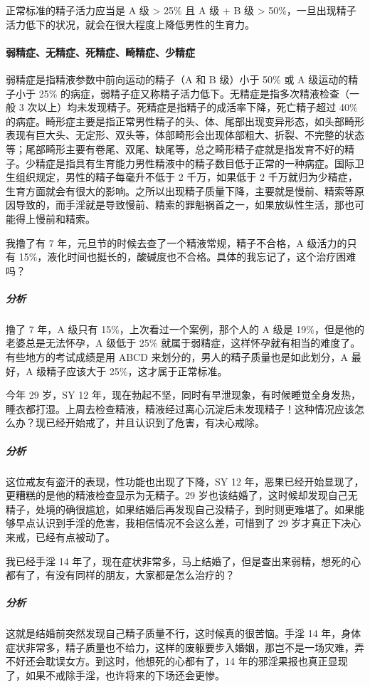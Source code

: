 正常标准的精子活力应当是 A 级 > 25\% 且 A 级 + B 级 > 50\%，一旦出现精子活力低下的状况，就会在很大程度上降低男性的生育力。

\paragraph{弱精症、无精症、死精症、畸精症、少精症}

弱精症是指精液参数中前向运动的精子（A 和 B 级）小于 50\% 或 A 级运动的精子小于 25\% 的病症，弱精子症又称精子活力低下。无精症是指多次精液检查（一般 3 次以上）均未发现精子。死精症是指精子的成活率下降，死亡精子超过 40\% 的病症。畸形症主要是指正常男性精子的头、体、尾部出现变异形态，如头部畸形表现有巨大头、无定形、双头等，体部畸形会出现体部粗大、折裂、不完整的状态等；尾部畸形主要有卷尾、双尾、缺尾等，总之畸形精子症就是指发育不好的精子。少精症是指具有生育能力男性精液中的精子数目低于正常的一种病症。国际卫生组织规定，男性的精子每毫升不低于 2 千万，如果低于 2 千万就归为少精症，生育方面就会有很大的影响。之所以出现精子质量下降，主要就是慢前、精索等原因导致的，而手淫就是导致慢前、精索的罪魁祸首之一，如果放纵性生活，那也可能得上慢前和精索。

\begin{case}[不孕不育]
    我撸了有 7 年，元旦节的时候去查了一个精液常规，精子不合格，A 级活力的只有 15\%，液化时间也挺长的，酸碱度也不合格。具体的我忘记了，这个治疗困难吗？
    \subparagraph{分析} 撸了 7 年，A 级只有 15\%，上次看过一个案例，那个人的 A 级是 19\%，但是他的老婆总是无法怀孕，A 级低于 25\% 就属于弱精症，这样怀孕就有相当的难度了。有些地方的考试成绩是用 ABCD 来划分的，男人的精子质量也是如此划分，A 最好，A 级精子应该大于 25\%，这才属于正常标准。
\end{case}

\begin{case}[不孕不育]
    今年 29 岁，SY 12 年，现在勃起不坚，同时有早泄现象，有时候睡觉全身发热，睡衣都打湿。上周去检查精液，精液经过离心沉淀后未发现精子！这种情况应该怎么办？现已经开始戒了，并且认识到了危害，有决心戒除。
    \subparagraph{分析} 这位戒友有盗汗的表现，性功能也出现了下降，SY 12 年，恶果已经开始显现了，更糟糕的是他的精液检查显示为无精子。29 岁也该结婚了，这时候却发现自己无精子，处境的确很尴尬，如果结婚后再发现自己没精子，到时则更难堪了。如果能够早点认识到手淫的危害，我相信情况不会这么差，可惜到了 29 岁才真正下决心来戒，已经有点被动了。
\end{case}

\begin{case}[不孕不育]
    我已经手淫 14 年了，现在症状非常多，马上结婚了，但是查出来弱精，想死的心都有了，有没有同样的朋友，大家都是怎么治疗的？
    \subparagraph{分析} 这就是结婚前突然发现自己精子质量不行，这时候真的很苦恼。手淫 14 年，身体症状非常多，精子质量也不给力，这样的废躯要步入婚姻，那岂不是一场灾难，弄不好还会耽误女方。到这时，他想死的心都有了，14 年的邪淫果报也真正显现了，如果不戒除手淫，也许将来的下场还会更惨。
\end{case}

